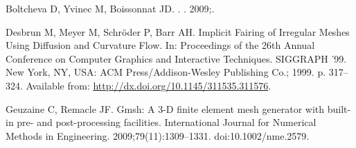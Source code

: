 \documentclass[10pt,letterpaper]{article}
\begin{document}
\begin{thebibliography}{10}
Boltcheva D, Yvinec M, Boissonnat JD.
.
. 2009;.

Desbrun M, Meyer M, Schr\"{o}der P, Barr AH.
\newblock Implicit Fairing of Irregular Meshes Using Diffusion and Curvature
  Flow.
\newblock In: Proceedings of the 26th Annual Conference on Computer Graphics
  and Interactive Techniques. SIGGRAPH '99. New York, NY, USA: ACM
  Press/Addison-Wesley Publishing Co.; 1999. p. 317--324.
\newblock Available from: \url{http://dx.doi.org/10.1145/311535.311576}.

Geuzaine C, Remacle JF.
\newblock Gmsh: A 3-D finite element mesh generator with built-in pre- and
  post-processing facilities.
\newblock International Journal for Numerical Methods in Engineering.
  2009;79(11):1309--1331.
\newblock doi:{10.1002/nme.2579}.

\end{thebibliography}
\end{document}

